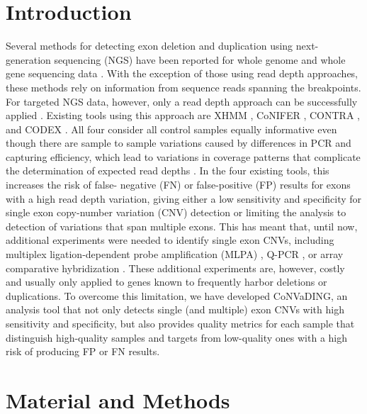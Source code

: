 \section{Introduction}\label{introduction}
Several methods for detecting exon deletion and duplication using next-generation sequencing (NGS) have been reported for whole genome \cite{Zhao_2013,Gilissen_2014,Francioli_2014} and whole gene sequencing data \cite{Wang_2014}. 
With the exception of those using read depth approaches, these methods rely on information from sequence reads spanning the breakpoints. 
For targeted NGS data, however, only a read depth approach can be successfully applied \cite{Tan_2014}. 
Existing tools using this approach are XHMM \cite{Fromer_2012}, CoNIFER \cite{Krumm_2012}, CONTRA \cite{Li_2012}, and CODEX \cite{Jiang_2015}. 
All four consider all control samples equally informative even though there are sample to sample variations caused by differences in PCR and capturing efficiency, which lead to variations in coverage patterns that complicate the determination of expected read depths \cite{Aird_2011}\cite{Zhao_2013}. 
In the four existing tools, this increases the risk of false- negative (FN) or false-positive (FP) results for exons with a high read depth variation, giving either a low sensitivity and specificity for single exon copy-number variation (CNV) detection or limiting the analysis to detection of variations that span multiple exons. 
This has meant that, until now, additional experiments were needed to identify single exon CNVs, including multiplex ligation-dependent probe amplification (MLPA) \cite{Schouten_2002}, Q-PCR \cite{Ebenazer_2013}, or array comparative hybridization \cite{Vasson_2013}. 
These additional experiments are, however, costly and usually only applied to genes known to frequently harbor deletions or duplications. 
To overcome this limitation, we have developed CoNVaDING, an analysis tool that not only detects single (and multiple) exon CNVs with high sensitivity and specificity, but also provides quality metrics for each sample that distinguish high-quality samples and targets from low-quality ones with a high risk of producing FP or FN results.

\section{Material and Methods}

